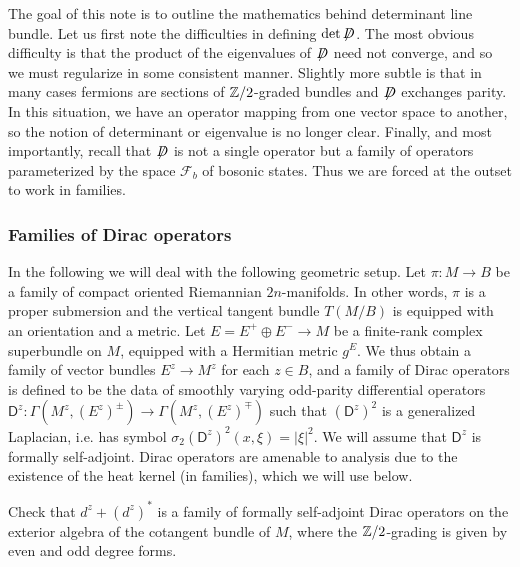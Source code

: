 \documentclass{amsart}
\newcommand{\fsl}[1]{{\centernot{#1}}}
\renewcommand\d{\mathsf{D}}
\begin{document}
The goal of this note is to outline the mathematics behind determinant line bundle.
Let us first note the difficulties in defining $\det\fsl D$. The most
obvious difficulty is that the product of the eigenvalues of $\fsl D$ need not converge,
and so we must regularize in some consistent manner. Slightly more subtle is that in
many cases fermions are sections of $\mathbb{Z}/2$-graded bundles and $\fsl D$ exchanges parity.
In this situation, we have an operator mapping from one vector space to another, so the
notion of determinant or eigenvalue is no longer clear. Finally, and most importantly,
recall that $\fsl D$ is not a single operator but a family of operators parameterized
by the space $\mathcal{F}_b$ of bosonic states. Thus we are forced at the outset
to work in families.

\subsubsection{Families of Dirac operators}

In the following we will deal with the following geometric setup. Let
$\pi:M\to B$ be a family of compact oriented Riemannian $2n$-manifolds. In other
words, $\pi$ is a proper submersion and the vertical tangent bundle $T(M/B)$ is equipped
with an orientation and a metric. Let $E=E^+\oplus E^-\to M$ be a finite-rank complex superbundle
on $M$, equipped with a Hermitian metric $g^E$. We thus obtain a family of vector bundles
$E^z\to M^z$ for each $z\in B$, and a family of Dirac operators is defined to be the data
of smoothly varying odd-parity
differential operators $\d^z:\Gamma(M^z, (E^z)^\pm)\to\Gamma(M^z,(E^z)^\mp)$
such that $(\d^z)^2$ is a generalized Laplacian, i.e. has symbol $\sigma_2(\d^z)^2(x,\xi)=|\xi|^2$.
We will assume that $\d^z$ is formally self-adjoint. Dirac operators are amenable to
analysis due to the existence of the heat kernel (in families), which we will use below.

\begin{exercise}
    Check that $d^z+(d^z)^*$ is a family of formally self-adjoint Dirac operators on the
    exterior algebra of the cotangent bundle of $M$, where the $\mathbb{Z}/2$-grading is given
    by even and odd degree forms.
\end{exercise}
\end{document}
